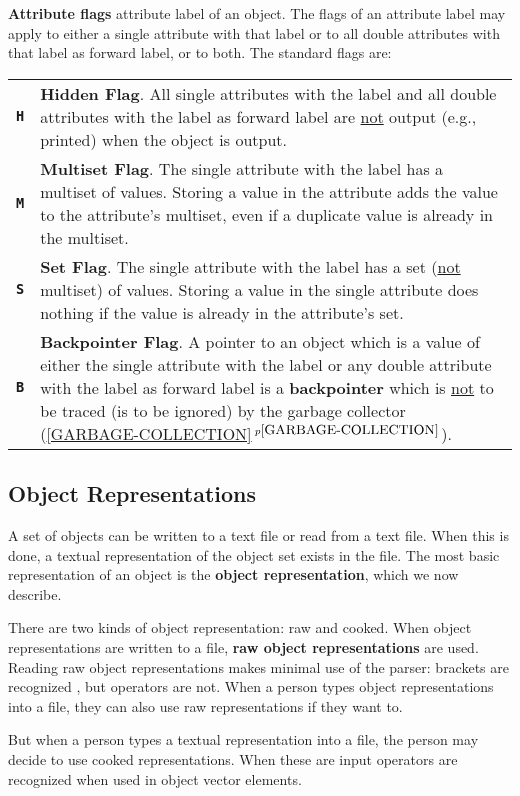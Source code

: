 \documentclass[12pt]{article}
\newcommand{\TT}[1]{{\tt \bfseries #1}}
\newcommand{\key}[1]{{\rm \bfseries #1}}
\newcommand{\itemref}[1]{\ref{#1}$\,^{p\pageref{#1}}$}
\begin{document}
\key{Attribute flags}
attribute label of an object.  The flags of an attribute label
may apply to either a single attribute with that label or to all
double attributes with that label as forward label, or to both.
The standard flags are:
\begin{center}
\begin{tabular}{lp{5.0in}}
\TT{H} & {\bf Hidden Flag}.  All single attributes with the label
and all double attributes with the label as forward label are
\underline{not} output (e.g., printed) when the object is output.
\\[0.5ex]
\TT{M} & {\bf Multiset Flag}.  The single attribute with the label
has a multiset of values.  Storing a value in the attribute adds the
value to the attribute's multiset, even if a duplicate value is already
in the multiset.
\\[0.5ex]
\TT{S} & {\bf Set Flag}.  The single attribute with the label
has a set (\underline{not} multiset) of values.  Storing a value in the
single attribute does nothing if the value is already in the attribute's set.
\\[0.5ex]
\TT{B} & {\bf Backpointer Flag}.  A pointer to an object which is a value
of either the single attribute with the label or any double attribute
with the label as forward label is a \key{backpointer} which is
\underline{not} to be traced (is to be ignored) by the
garbage collector (\itemref{GARBAGE-COLLECTION}).
\end{tabular}
\end{center}

\subsection{Object Representations}
\label{OBJECT-REPRESENTATIONS}

A set of objects can be written to a text file or read from a text file.
When this is done, a textual representation of the object set exists
in the file.  The most basic representation of an object
is the \key{object representation}, which we now describe.

There are two kinds of object representation:
raw and cooked.
When object representations are written to a file,
\key{raw object representations}
are used.  Reading raw object representations
makes minimal use of the parser: brackets are recognized , but operators
are not.  When a person types object representations into a file,
they can also use raw representations if they want to.

But when a person types a textual representation into a file,
the person
may decide to use cooked representations.  When these are input
operators are recognized when used in object vector elements.
\end{document}
